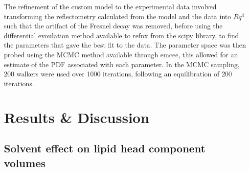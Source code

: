 \documentclass[twoside,twocolumn,9pt]{article}
\begin{document}
The refinement of the custom model to the experimental data involved transforming the reflectometry calculated from the model and the data into $Rq^4$ such that the artifact of the Fresnel decay was removed, before using the differential evoulation method available to refnx from the scipy library,\cite{Jones2001} to find the parameters that gave the best fit to the data. The parameter space was then probed using the MCMC method available through emcee, this allowed for an estimate of the PDF associated with each parameter. In the MCMC sampling, 200 walkers were used over 1000 iterations, following an equilibration of 200 iterations.

\section{Results \& Discussion}

\subsection{Solvent effect on lipid head component volumes}
\end{document}
